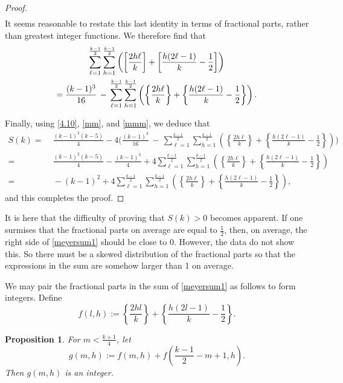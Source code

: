 \documentclass[11pt,reqno]{amsart}
\theoremstyle{plain}
\numberwithin{equation}{section}
\newtheorem{proposition}[theorem]{Proposition}
\begin{document}
\begin{proof}
\begin{align}
\label{mm}
\end{align}
It seems reasonable to  restate this last identity in terms of fractional parts, rather than greatest integer functions.  We therefore find that
\begin{gather}
\sum_{\ell=1}^{\frac{k-1}{2}}\sum_{h=1}^{\frac{k-1}{2}}\left(\left[\frac{2h\ell}{k}\right] + \left[\frac{h(2\ell-1)}{k}-\frac{1}{2}\right]\right)\notag\\ = \frac{(k-1)^3}{16}\,-\, \sum_{\ell=1}^{\frac{k-1}{2}}\sum_{h=1}^{\frac{k-1}{2}}\left(\left\{\frac{2h\ell}{k}\right\} + \left\{\frac{h(2\ell-1)}{k}-\frac{1}{2}\right\}\right).\label{mmm}
\end{gather}

 Finally, using \eqref{4.10}, \eqref{mm}, and \eqref{mmm}, we deduce that
\begin{align}\label{meyersum1}
S(k)  =&\; \frac{(k-1)^2(k-5)}{4} - 4\Biggl(\frac{(k-1)^3}{16}\,-\, \sum_{\ell=1}^{\frac{k-1}{2}}\sum_{h=1}^{\frac{k-1}{2}}\left(\left\{\frac{2h\ell}{k}\right\} + \left\{\frac{h(2\ell-1)}{k}-\frac{1}{2}\right\}\right)\Biggr)\nonumber\\
=&\; \frac{(k-1)^2(k-5)}{4} - \frac{(k-1)^3}{4}+4 \sum_{\ell=1}^{\frac{k-1}{2}}\sum_{h=1}^{\frac{k-1}{2}}\left(\left\{\frac{2h\ell}{k}\right\} + \left\{\frac{h(2\ell-1)}{k}-\frac{1}{2}\right\}\right)\nonumber\\
=&\; -(k-1)^2 + 4 \sum_{\ell=1}^{\frac{k-1}{2}}\sum_{h=1}^{\frac{k-1}{2}}\left(\left\{\frac{2h\ell}{k}\right\} + \left\{\frac{h(2\ell-1)}{k}-\frac{1}{2}\right\}\right),
\end{align}
and this completes the proof.
\end{proof}


  It is here that the difficulty of proving that $S(k)>0$ becomes apparent. If one surmises that the fractional parts on average are equal to $\tfrac{1}{2}$, then, on average, the right side of \eqref{meyersum1} should be close to 0.  However, the data do not show this.  So there must be a skewed distribution of the fractional parts so that the expressions in the sum are somehow larger than 1 on average.


We may pair the fractional parts in the sum of \eqref{meyersum1} as follows to form integers. Define
 $$f(l,h):=\left\{\frac{2hl}{k}\right\}+\left\{\frac{h(2l-1)}{k}-\frac{1}{2}\right\}.$$
\begin{proposition}\label{proposition6.2}
	For $m<\frac{k+1}{4}$, let
$$g(m,h):=f(m,h)+f\left(\frac{k-1}{2}-m+1,h\right).$$
 Then $g(m,h)$ is an integer.
\end{proposition}
\end{document}
